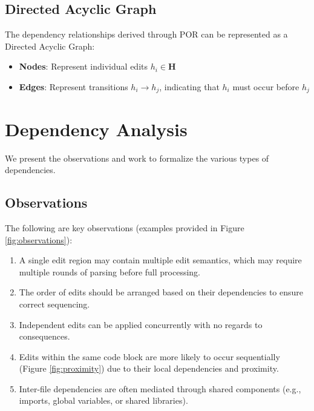 \subsection{Directed Acyclic Graph}
The dependency relationships derived through POR can be represented as a Directed Acyclic Graph: 
\begin{itemize}
    \item \textbf{Nodes}: Represent individual edits $h_i \in \mathbf{H}$
    \item \textbf{Edges}: Represent transitions $h_i \rightarrow h_j$, indicating that $h_i$ must occur before $h_j$
\end{itemize}

\section{Dependency Analysis}
We present the observations and work to formalize the various types of dependencies.

\subsection{Observations}

The following are key observations (examples provided in Figure \ref{fig:observations}):

\begin{enumerate}
    \item A single edit region may contain multiple edit semantics, which may require multiple rounds of parsing before full processing.
    \item The order of edits should be arranged based on their dependencies to ensure correct sequencing.
    \item Independent edits can be applied concurrently with no regards to consequences.
    \item Edits within the same code block are more likely to occur sequentially (Figure \ref{fig:proximity}) due to their local dependencies and proximity.
    \item Inter-file dependencies are often mediated through shared components (e.g., imports, global variables, or shared libraries).
\end{enumerate}


